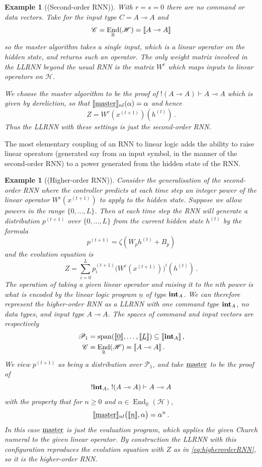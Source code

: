 \documentclass[english,letter paper,12pt,leqno]{article}
\theoremstyle{example}
\newtheorem{example}[theorem]{Example}
\numberwithin{equation}{section}
\def\be{\begin{equation}}
\def\ee{\end{equation}}
\DeclareMathOperator{\End}{End}
\begin{document}
\begin{example}[(Second-order RNN)] With $r = s = 0$ there are no command or data vectors. Take for the input type $C = A \multimap A$ and
\[
\mathscr{C} = \End_{\mathbb{R}}(\mathscr{H}) = \den{A \multimap A}
\]
so the master algorithm takes a single input, which is a linear operator on the hidden state, and returns such an operator. The only weight matrix involved in the LLRNN beyond the usual RNN is the matrix $W^c$ which maps inputs to linear operators on $\mathscr{H}$.

We choose the master algorithm to be the proof of ${!}(A \multimap A) \vdash A \multimap A$ which is given by dereliction, so that $\llbracket \underline{\textup{master}} \rrbracket_{nl}(\alpha) = \alpha$ and hence
\be\label{eq:secondorderRNNinLLRNN}
Z = W^c(x^{(t+1)})(h^{(t)})\,.
\ee
Thus the LLRNN with these settings is just the second-order RNN.
\end{example}

The most elementary coupling of an RNN to linear logic adds the ability to raise linear operators (generated say from an input symbol, in the manner of the second-order RNN) to a power generated from the hidden state of the RNN. 

\begin{example}[(Higher-order RNN)] Consider the generalisation of the second-order RNN where the controller predicts at each time step an integer power of the linear operator $W^c(x^{(t+1)})$ to apply to the hidden state. Suppose we allow powers in the range $\{0,\ldots,L\}$. Then at each time step the RNN will generate a distribution $p^{(t+1)}$ over $\{0,\ldots,L\}$ from the current hidden state $h^{(t)}$ by the formula
\[
p^{(t+1)} = \zeta( W_p h^{(t)} + B_p )
\]
and the evolution equation is
\be\label{eq:higherorderRNN}
Z = \sum_{i=0}^L p_i^{(t+1)} \big( W^c(x^{(t+1)}) \big)^i(h^{(t)})\,.
\ee
The operation of taking a given linear operator and raising it to the $n$th power is what is encoded by the linear logic program $\underline{n}$ of type $\textbf{int}_A$. We can therefore represent the higher-order RNN as a LLRNN with one command type $\textbf{int}_A$, no data types, and input type $A \multimap A$. The spaces of command and input vectors are respectively
\begin{align*}
\mathscr{P}_1 &= \operatorname{span}(\den{\underline{0}}, \ldots, \den{\underline{L}}) \subseteq \den{\inta_A}\,,\\
\mathscr{C} &= \End_{\mathbb{R}}(\mathscr{H}) = \den{A \multimap A}\,.
\end{align*}
We view $p^{(t+1)}$ as being a distribution over $\mathscr{P}_1$, and take $\underline{\textup{master}}$ to be the proof of
\[
{!}\textbf{int}_A, \, {!}(A \multimap A) \vdash A \multimap A
\]
with the property that for $n \ge 0$ and $\alpha \in \End_{\mathbb{R}}(\mathscr{H})$,
\be
\den{\master}_{nl}\big( \den{\underline{n}}, \alpha \big) = \alpha^n\,.
\ee
In this case $\underline{\textup{master}}$ is just the evaluation program, which applies the given Church numeral to the given linear operator. By construction the LLRNN with this configuration reproduces the evolution equation with $Z$ as in \eqref{eq:higherorderRNN}, so it is the higher-order RNN.
\end{example}
\end{document}
